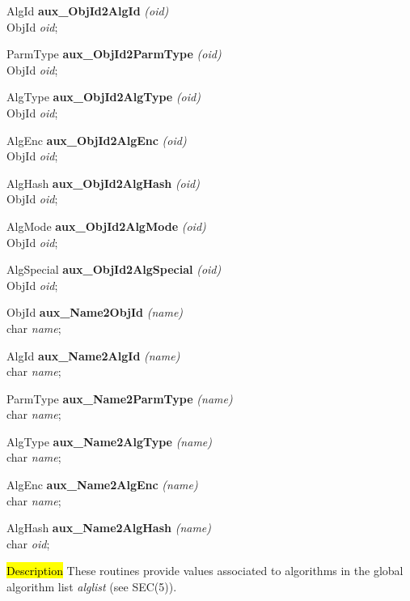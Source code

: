 AlgId {\bf *aux\_ObjId2AlgId} {\em (oid)}  \\
ObjId {\em *oid};

ParmType {\bf aux\_ObjId2ParmType} {\em (oid)} \\
ObjId {\em *oid};

AlgType {\bf aux\_ObjId2AlgType} {\em (oid)}  \\
ObjId {\em *oid};

AlgEnc {\bf aux\_ObjId2AlgEnc} {\em (oid)}  \\
ObjId {\em *oid};

AlgHash {\bf aux\_ObjId2AlgHash} {\em (oid)}  \\
ObjId {\em *oid};

AlgMode {\bf aux\_ObjId2AlgMode} {\em (oid)}  \\
ObjId {\em *oid};

AlgSpecial {\bf aux\_ObjId2AlgSpecial} {\em (oid)}  \\
ObjId {\em *oid};

ObjId {\bf *aux\_Name2ObjId} {\em (name)}  \\
char {\em *name};

AlgId {\bf *aux\_Name2AlgId} {\em (name)}  \\
char {\em *name};

ParmType {\bf aux\_Name2ParmType} {\em (name)} \\
char {\em *name};

AlgType {\bf aux\_Name2AlgType} {\em (name)}  \\
char {\em *name};

AlgEnc {\bf aux\_Name2AlgEnc} {\em (name)}  \\
char {\em *name};

AlgHash {\bf aux\_Name2AlgHash} {\em (name)}  \\
char {\em *oid};

\hl{Description}
These routines provide values associated to algorithms in the global
algorithm list {\em alglist} (see SEC(5)).

